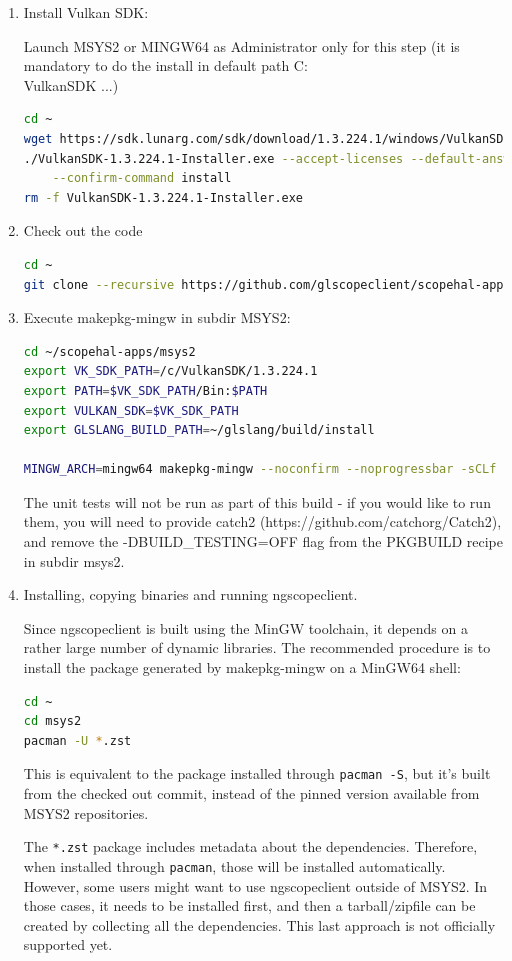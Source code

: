 \begin{enumerate}
\item Install Vulkan SDK:

Launch MSYS2 or MINGW64 as Administrator only for this step (it is mandatory to do the install in default path C:\\VulkanSDK ...)
\begin{lstlisting}[language=sh, numbers=none]
cd ~
wget https://sdk.lunarg.com/sdk/download/1.3.224.1/windows/VulkanSDK-1.3.224.1-Installer.exe
./VulkanSDK-1.3.224.1-Installer.exe --accept-licenses --default-answer \
	--confirm-command install
rm -f VulkanSDK-1.3.224.1-Installer.exe
\end{lstlisting}

\item Check out the code

\begin{lstlisting}[language=sh, numbers=none]
cd ~
git clone --recursive https://github.com/glscopeclient/scopehal-apps
\end{lstlisting}

\item Execute makepkg-mingw in subdir MSYS2:

\begin{lstlisting}[language=sh, numbers=none]
cd ~/scopehal-apps/msys2
export VK_SDK_PATH=/c/VulkanSDK/1.3.224.1
export PATH=$VK_SDK_PATH/Bin:$PATH
export VULKAN_SDK=$VK_SDK_PATH
export GLSLANG_BUILD_PATH=~/glslang/build/install

MINGW_ARCH=mingw64 makepkg-mingw --noconfirm --noprogressbar -sCLf
\end{lstlisting}

The unit tests will not be run as part of this build - if you would like to run them, you will need to provide catch2
(https://github.com/catchorg/Catch2), and remove the -DBUILD\_TESTING=OFF flag from the PKGBUILD recipe in subdir
msys2.

\item Installing, copying binaries and running ngscopeclient.

Since ngscopeclient is built using the MinGW toolchain, it depends on a rather large number of dynamic libraries.
The recommended procedure is to install the package generated by makepkg-mingw on a MinGW64 shell:

\begin{lstlisting}[language=sh, numbers=none]
cd ~
cd msys2
pacman -U *.zst
\end{lstlisting}

This is equivalent to the package installed through \lstinline{pacman -S}, but it's built from the checked out commit,
instead of the pinned version available from MSYS2 repositories.

The \lstinline{*.zst} package includes metadata about the dependencies.
Therefore, when installed through \lstinline{pacman}, those will be installed automatically.
However, some users might want to use ngscopeclient outside of MSYS2.
In those cases, it needs to be installed first, and then a tarball/zipfile can be created by collecting all the dependencies.
This last approach is not officially supported yet.

\end{enumerate}

